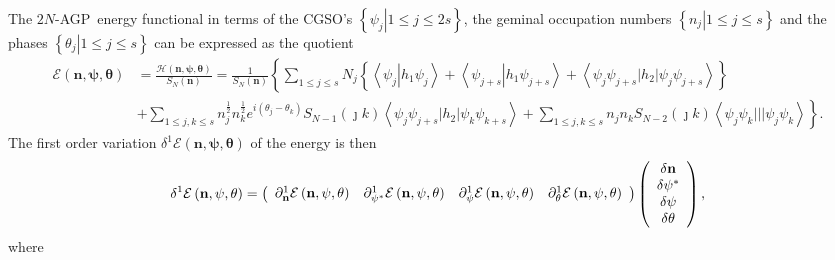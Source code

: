 \documentclass[aps,preprint]{revtex4}%
\begin{document}
The $2N$-AGP\ energy functional in terms of the CGSO's $\left\{  \left.
\psi_{j}\right\vert 1\leq j\leq2s\right\}  $, the geminal occupation numbers
$\left\{  \left.  n_{j}\right\vert 1\leq j\leq s\right\}  $ and the phases
$\left\{  \left.  \theta_{j}\right\vert 1\leq j\leq s\right\}  $ can be
expressed as the quotient%
\begin{align}
\mathcal{E}\left(  \mathbf{n},\mathbf{\psi},\mathbf{\theta}\right)   &
=\frac{\mathcal{H}\left(  \mathbf{n},\mathbf{\psi},\mathbf{\theta}\right)
}{S_{N}\left(  \mathbf{n}\right)  }=\frac{1}{S_{N}\left(  \mathbf{n}\right)
}\left\{  \sum_{1\leq j\leq s}N_{j}\left\{  \left\langle \psi_{j}\left\vert
h_{1}\psi_{j}\right.  \right\rangle +\left\langle \psi_{j+s}\left\vert
h_{1}\psi_{j+s}\right.  \right\rangle +\left\langle \psi_{j}\psi_{j+s}%
|h_{2}|\psi_{j}\psi_{j+s}\right\rangle \right\}  \right. \nonumber\\
&  +\left.  \sum_{1\leq j,k\leq s}n_{j}^{\frac{1}{2}}n_{k}^{\frac{1}{2}%
}e^{i\left(  \theta_{j}-\theta_{k}\right)  }S_{N-1}\left(  \jmath k\right)
\left\langle \psi_{j}\psi_{j+s}|h_{2}|\psi_{k}\psi_{k+s}\right\rangle
+\sum_{1\leq j,k\leq s}n_{j}n_{k}S_{N-2}\left(  \jmath k\right)  \left\langle
\psi_{j}\psi_{k}|||\psi_{j}\psi_{k}\right\rangle \right\}  .
\end{align}
The first order variation $\delta^{1}\mathcal{E}\left(  \mathbf{n}%
,\mathbf{\psi},\mathbf{\theta}\right)  $ of the energy is then%
\begin{equation}
\delta^{1}\mathcal{E}\left(  \mathbf{n},\mathbf{\psi},\mathbf{\theta}\right)
=\left(
\begin{array}
[c]{cccc}%
\partial_{\mathbf{n}}^{1}\mathcal{E}\left(  \mathbf{n},\mathbf{\psi
},\mathbf{\theta}\right)  & \partial_{\mathbf{\psi}^{\ast}}^{1}\mathcal{E}%
\left(  \mathbf{n},\mathbf{\psi},\mathbf{\theta}\right)  & \partial
_{\mathbf{\psi}}^{1}\mathcal{E}\left(  \mathbf{n},\mathbf{\psi},\mathbf{\theta
}\right)  & \partial_{\mathbf{\theta}}^{1}\mathcal{E}\left(  \mathbf{n}%
,\mathbf{\psi},\mathbf{\theta}\right)
\end{array}
\right)  \left(
\begin{array}
[c]{c}%
\delta\mathbf{n}\\
\delta\mathbf{\psi}^{\ast}\\
\delta\mathbf{\psi}\\
\delta\mathbf{\theta}%
\end{array}
\right)  ,
\end{equation}
where
\end{document}
